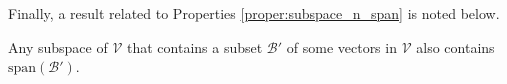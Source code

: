 Finally, a result related to Properties \ref{proper:subspace_n_span} is noted below.
\begin{proper}
\label{proper:WcontainsspanS}
Any subspace of $\mathcal{V}$ that contains a subset $\mathcal{B}'$ of some vectors in $\mathcal{V}$ also contains $\text{span}(\mathcal{B}')$.
\end{proper}


